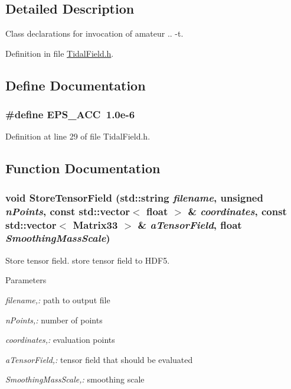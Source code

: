 \subsection{Detailed Description}
Class declarations for invocation of amateur .. -\/t. 

Definition in file \hyperlink{TidalField_8h_source}{TidalField.h}.



\subsection{Define Documentation}
\subsubsection[{EPS\_\-ACC}]{\setlength{\rightskip}{0pt plus 5cm}\#define EPS\_\-ACC~1.0e-\/6}\label{TidalField_8h_a78d04e3c97de8dbf9d3250a633814e99}


Definition at line 29 of file TidalField.h.



\subsection{Function Documentation}
\subsubsection[{StoreTensorField}]{\setlength{\rightskip}{0pt plus 5cm}void StoreTensorField (std::string {\em filename}, \/  unsigned {\em nPoints}, \/  const std::vector$<$ float $>$ \& {\em coordinates}, \/  const std::vector$<$ {\bf Matrix33} $>$ \& {\em aTensorField}, \/  float {\em SmoothingMassScale})}\label{TidalField_8h_a4148c344aade56863506eafe83d9161e}


Store tensor field. store tensor field to HDF5. 


\begin{DoxyParams}{Parameters}
\item[{\em filename,:}]path to output file \item[{\em nPoints,:}]number of points \item[{\em coordinates,:}]evaluation points \item[{\em aTensorField,:}]tensor field that should be evaluated \item[{\em SmoothingMassScale,:}]smoothing scale \end{DoxyParams}


